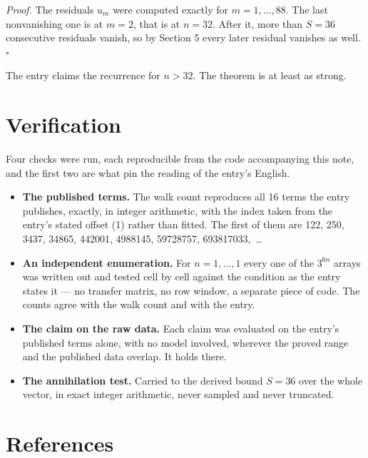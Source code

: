 \documentclass[11pt]{article}
\theoremstyle{definition}
\begin{document}
{\itshape Proof.} The residuals $u_m$ were computed exactly for $m = 1,\dots,88$. The last nonvanishing one is at $m = 2$, that is at $n = 32$. After it, more than $S = 36$ consecutive residuals vanish, so by Section 5 every later residual vanishes as well. $\square$

The entry claims the recurrence for $n > 32$. The theorem is at least as strong.

\section{Verification}

Four checks were run, each reproducible from the code accompanying this note, and the first two are what pin the reading of the entry's English.

\begin{itemize}

\item {\bfseries The published terms.} The walk count reproduces all 16 terms the entry publishes, exactly, in integer arithmetic, with the index taken from the entry's stated offset (1) rather than fitted. The first of them are 122, 250, 3437, 34865, 442001, 4988145, 59728757, 693817033,~\dots

\item {\bfseries An independent enumeration.} For $n = 1,\dots,1$ every one of the $3^{6n}$ arrays was written out and tested cell by cell against the condition as the entry states it --- no transfer matrix, no row window, a separate piece of code. The counts agree with the walk count and with the entry.

\item {\bfseries The claim on the raw data.} Each claim was evaluated on the entry's published terms alone, with no model involved, wherever the proved range and the published data overlap. It holds there.

\item {\bfseries The annihilation test.} Carried to the derived bound $S = 36$ over the whole vector, in exact integer arithmetic, never sampled and never truncated.

\end{itemize}

\section{References}
\end{document}
